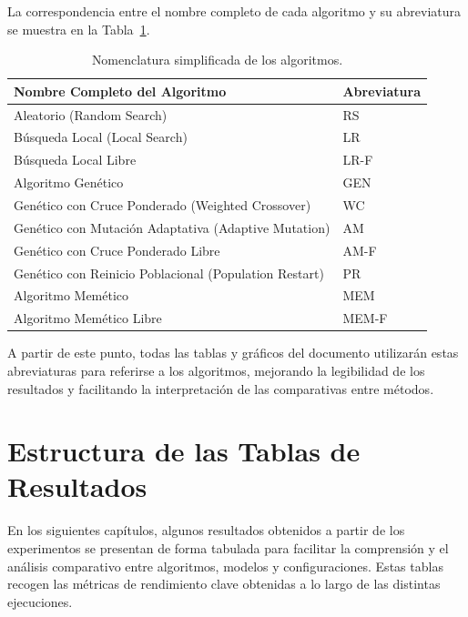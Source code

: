 La correspondencia entre el nombre completo de cada algoritmo y su abreviatura se muestra en la Tabla~\ref{tab:nombres-algoritmos}.

\begin{table}[htp]
    \centering
    \begin{tabular}{ll}
        \toprule
        \textbf{Nombre Completo del Algoritmo}                 & \textbf{Abreviatura} \\
        \midrule
        Aleatorio (Random Search)                              & RS                   \\
        Búsqueda Local (Local Search)                          & LR                   \\
        Búsqueda Local Libre                                   & LR-F                 \\
        Algoritmo Genético                                     & GEN                  \\
        Genético con Cruce Ponderado (Weighted Crossover)      & WC                   \\
        Genético con Mutación Adaptativa (Adaptive Mutation)   & AM                   \\
        Genético con Cruce Ponderado Libre                     & AM-F                 \\
        Genético con Reinicio Poblacional (Population Restart) & PR                   \\
        Algoritmo Memético                                     & MEM                  \\
        Algoritmo Memético Libre                               & MEM-F                \\
        \bottomrule
    \end{tabular}
    \caption{Nomenclatura simplificada de los algoritmos.}
    \label{tab:nombres-algoritmos}
\end{table}

A partir de este punto, todas las tablas y gráficos del documento utilizarán estas abreviaturas para referirse a los algoritmos,
mejorando la legibilidad de los resultados y facilitando la interpretación de las comparativas entre métodos.


\section{Estructura de las Tablas de Resultados}\label{subsec:estructura-tablas}
En los siguientes capítulos, algunos resultados obtenidos a partir de los experimentos se presentan de forma tabulada para facilitar la
comprensión y el análisis comparativo entre algoritmos, modelos y configuraciones.
Estas tablas recogen las métricas de rendimiento clave obtenidas a lo largo de las distintas ejecuciones.

